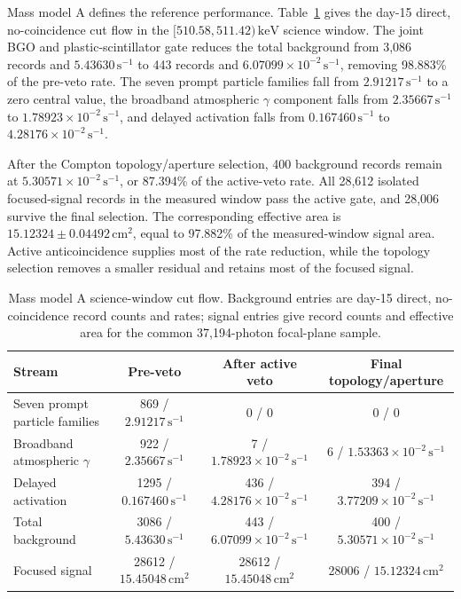 \documentclass[11pt]{article}
\newcommand{\keV}{\ensuremath{\,\mathrm{keV}}}
\newcommand{\cps}{\ensuremath{\,\mathrm{s^{-1}}}}
\begin{document}
Mass model A defines the reference performance. Table~\ref{tab:phase2_cutflow} gives the day-15 direct, no-coincidence cut flow in the $[510.58,511.42)\keV$ science window. The joint BGO and plastic-scintillator gate reduces the total background from 3,086 records and $5.43630\cps$ to 443 records and $6.07099\times10^{-2}\cps$, removing 98.883\% of the pre-veto rate. The seven prompt particle families fall from $2.91217\cps$ to a zero central value, the broadband atmospheric $\gamma$ component falls from $2.35667\cps$ to $1.78923\times10^{-2}\cps$, and delayed activation falls from $0.167460\cps$ to $4.28176\times10^{-2}\cps$.

After the Compton topology/aperture selection, 400 background records remain at $5.30571\times10^{-2}\cps$, or 87.394\% of the active-veto rate. All 28,612 isolated focused-signal records in the measured window pass the active gate, and 28,006 survive the final selection. The corresponding effective area is $15.12324\pm0.04492\,\mathrm{cm^2}$, equal to 97.882\% of the measured-window signal area. Active anticoincidence supplies most of the rate reduction, while the topology selection removes a smaller residual and retains most of the focused signal.

\begin{table}[H]
\centering
\caption{Mass model A science-window cut flow. Background entries are day-15 direct, no-coincidence record counts and rates; signal entries give record counts and effective area for the common 37,194-photon focal-plane sample.}
\label{tab:phase2_cutflow}
\footnotesize
\begin{tabular}{lccc}
\toprule
Stream & Pre-veto & After active veto & Final topology/aperture \\
\midrule
Seven prompt particle families & 869 / $2.91217\cps$ & 0 / 0 & 0 / 0 \\
Broadband atmospheric $\gamma$ & 922 / $2.35667\cps$ & 7 / $1.78923\times10^{-2}\cps$ & 6 / $1.53363\times10^{-2}\cps$ \\
Delayed activation & 1295 / $0.167460\cps$ & 436 / $4.28176\times10^{-2}\cps$ & 394 / $3.77209\times10^{-2}\cps$ \\
Total background & 3086 / $5.43630\cps$ & 443 / $6.07099\times10^{-2}\cps$ & 400 / $5.30571\times10^{-2}\cps$ \\
Focused signal & 28612 / $15.45048\,\mathrm{cm^2}$ & 28612 / $15.45048\,\mathrm{cm^2}$ & 28006 / $15.12324\,\mathrm{cm^2}$ \\
\bottomrule
\end{tabular}
\end{table}
\end{document}
